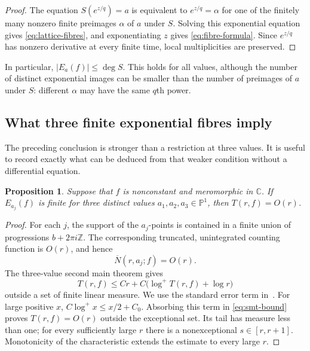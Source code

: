 \documentclass[11pt,reqno]{amsart}
\numberwithin{equation}{section}
\newtheorem{proposition}[theorem]{Proposition}
\theoremstyle{definition}
\theoremstyle{remark}
\newcommand{\C}{\mathbb C}
\newcommand{\Z}{\mathbb Z}
\newcommand{\PP}{\mathbb P}
\begin{document}
\begin{proof}
The equation $S(e^{z/q})=a$ is equivalent to
$e^{z/q}=\alpha$ for one of the finitely many nonzero finite
preimages $\alpha$ of $a$ under $S$. Solving this exponential
equation gives \eqref{eq:lattice-fibres}, and exponentiating $z$
gives \eqref{eq:fibre-formula}. Since $e^{z/q}$ has nonzero
derivative at every finite time, local multiplicities are preserved.
\end{proof}

In particular, $|E_a(f)|\leq\deg S$. This holds for all values,
although the number of distinct exponential images can be smaller
than the number of preimages of $a$ under $S$: different $\alpha$
may have the same $q$th power.

\subsection{What three finite exponential fibres imply}

The preceding conclusion is stronger than a restriction at three
values. It is useful to record exactly what can be deduced from that
weaker condition without a differential equation.

\begin{proposition}
\label{prop:three-fibres}
Suppose that $f$ is nonconstant and meromorphic in $\C$. If
$E_{a_j}(f)$ is finite for three distinct values
$a_1,a_2,a_3\in\PP^1$, then $T(r,f)=O(r)$.
\end{proposition}

\begin{proof}
For each $j$, the support of the $a_j$-points is contained in a
finite union of progressions $b+2\pi i\Z$. The corresponding
truncated, unintegrated counting function is $O(r)$, and hence
\[
 \overline N(r,a_j;f)=O(r).
\]
The three-value second main theorem gives
\begin{equation}
 T(r,f)\leq Cr+
 C\bigl(\log^+T(r,f)+\log r\bigr)
 \label{eq:smt-bound}
\end{equation}
outside a set of finite linear measure. We use the standard error
term in~\cite{Hayman1964,Laine1993}. For large positive $x$,
$C\log^+x\leq x/2+C_0$. Absorbing this term in
\eqref{eq:smt-bound} proves $T(r,f)=O(r)$ outside the exceptional
set. Its tail has measure less than one; for every sufficiently
large $r$ there is a nonexceptional $s\in[r,r+1]$. Monotonicity of
the characteristic extends the estimate to every large $r$.
\end{proof}
\end{document}
